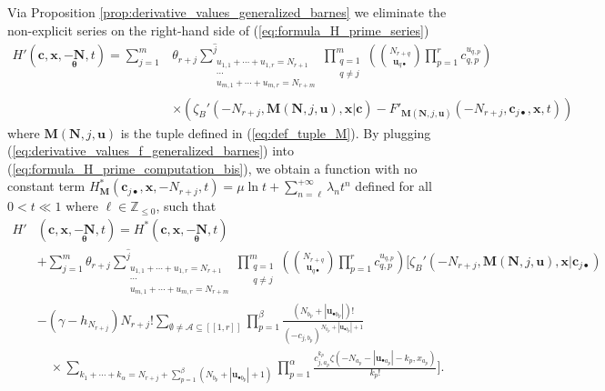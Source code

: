 \documentclass[a4paper]{amsart}
\theoremstyle{remark}
\theoremstyle{definition}
\begin{document}
Via Proposition \ref{prop:derivative_values_generalized_barnes} we eliminate the non-explicit series on the right-hand side of (\ref{eq:formula_H_prime_series})
\begin{align}
    H'(\mathbf{c},\mathbf{x},\underset{\bm{\theta}}{-\mathbf{N}},t) = \sum_{j=1}^m & \theta_{r+j} \sum^{\widehat{j}}_{\substack{u_{1,1}+\cdots+u_{1,r}=N_{r+1} \\ \cdots \\ u_{m,1}+\cdots+u_{m,r}=N_{r+m}}} \prod_{\substack{ q=1 \\ q \neq j}}^{m} \left( \binom{N_{r+q}}{\mathbf{u}_{q \bullet}} \prod_{p=1}^{r} c_{q,p}^{u_{q,p}} \right) \label{eq:formula_H_prime_computation_bis} \\
    & \times \left( \zeta_B'(-N_{r+j},\mathbf{M}(\mathbf{N},j,\mathbf{u}),\mathbf{x}|\mathbf{c}) - F'_{\mathbf{M}(\mathbf{N},j,\mathbf{u})}(-N_{r+j},\mathbf{c}_{j \bullet},\mathbf{x},t) \right) \nonumber
\end{align}
where $\mathbf{M}(\mathbf{N},j,\mathbf{u})$ is the tuple defined in (\ref{eq:def_tuple_M}). By plugging (\ref{eq:derivative_values_f_generalized_barnes}) into (\ref{eq:formula_H_prime_computation_bis}), we obtain a function with no constant term $H^*_{\mathbf{M}}(\mathbf{c}_{j \bullet},\mathbf{x},-N_{r+j},t) = \mu \ln t + \sum_{n=\ell}^{+\infty} \lambda_n t^{n}$ defined for all $0 < t \ll 1$ where $\ell \in \mathbb{Z}_{\leq 0}$, such that
\begin{align}
    H'&(\mathbf{c},\mathbf{x},\underset{\bm{\theta}}{-\mathbf{N}},t) = H^*(\mathbf{c},\mathbf{x},\underset{\bm{\theta}}{-\mathbf{N}},t) \label{eq:formula_H_prime} \\
    & + \sum_{j=1}^{m} \theta_{r+j} \sum^{\widehat{j}}_{\substack{u_{1,1}+\cdots+u_{1,r}=N_{r+1} \\ \cdots \\ u_{m,1}+\cdots+u_{m,r}=N_{r+m}}} \prod_{\substack{ q=1 \\ q \neq j}}^{m}  \left( \binom{N_{r+q}}{\mathbf{u}_{q\bullet}} \prod_{p=1}^{r} c_{q,p}^{u_{q,p}} \right) \Bigg[ \zeta_B'(-N_{r+j},\mathbf{M}(\mathbf{N},j,\mathbf{u}),\mathbf{x}|\mathbf{c}_{j\bullet}) \nonumber \\
    & - (\gamma-h_{N_{r+j}}) N_{r+j}! \sum_{\emptyset \neq \mathcal{A} \subseteq [\![1,r]\!]} \prod_{p=1}^{\beta} \frac{(N_{b_p}+|\mathbf{u}_{\bullet b_p}|)!}{(-c_{j,b_p})^{N_{b_p}+|\mathbf{u}_{\bullet b_p}|+1}} \nonumber \\
    & \quad \times \sum_{k_1+\cdots+k_{\alpha}= N_{r+j}+\sum_{p=1}^{\beta} (N_{b_p}+|\mathbf{u}_{\bullet b_p}|+1)} \prod_{p=1}^{\alpha} \frac{c_{j,a_p}^{k_p}\zeta(-N_{a_p}-|\mathbf{u}_{\bullet a_p}|-k_p,x_{a_p})}{k_p!} \Bigg]. \nonumber
\end{align}
\end{document}
